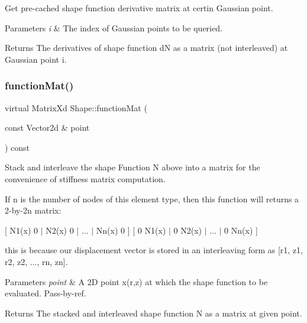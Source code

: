 Get pre-\/cached shape function derivative matrix at certin Gaussian point. 


\begin{DoxyParams}{Parameters}
{\em i} & The index of Gaussian points to be queried. \\
\hline
\end{DoxyParams}
\begin{DoxyReturn}{Returns}
The derivatives of shape function dN as a matrix (not interleaved) at Gaussian point i. 
\end{DoxyReturn}
\mbox{\label{class_shape_a7a2dc7c642bdea2a1359e3795fd9414d}} 
\subsubsection{\texorpdfstring{function\+Mat()}{functionMat()}\hspace{0.1cm}{\footnotesize\ttfamily [1/2]}}
{\footnotesize\ttfamily virtual Matrix\+Xd Shape\+::function\+Mat (\begin{DoxyParamCaption}\item[{const Vector2d \&}]{point }\end{DoxyParamCaption}) const\hspace{0.3cm}{\ttfamily [pure virtual]}}



Stack and interleave the shape Function N above into a matrix for the convenience of stiffness matrix computation. 

If n is the number of nodes of this element type, then this function will returns a 2-\/by-\/2n matrix\+:

\mbox{[} N1(x) 0 $\vert$ N2(x) 0 $\vert$ ... $\vert$ Nn(x) 0 \mbox{]} \mbox{[} 0 N1(x) $\vert$ 0 N2(x) $\vert$ ... $\vert$ 0 Nn(x) \mbox{]}

this is because our displacement vector is stored in an interleaving form as \mbox{[}r1, z1, r2, z2, ..., rn, zn\mbox{]}.


\begin{DoxyParams}{Parameters}
{\em point} & A 2D point x(r,z) at which the shape function to be evaluated. Pass-\/by-\/ref. \\
\hline
\end{DoxyParams}
\begin{DoxyReturn}{Returns}
The stacked and interleaved shape function N as a matrix at given point. 
\end{DoxyReturn}


